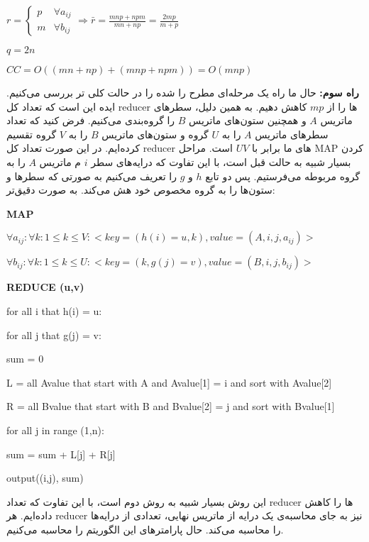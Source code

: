 \documentclass[a4paper,12pt]{article}
\begin{document}
\begin{LTR}
$r = \begin{cases}
	p & \forall a_{ij} \\
	m & \forall b_{ij}
\end{cases} \Rightarrow \bar{r} = \frac{mnp + npm}{mn + np} = \frac{2mp}{m+p}$

$q = 2n$

$CC = O((mn + np) + (mnp + npm)) = O(mnp)$

 \end{LTR}

\textbf{راه سوم: }
حال ما راه یک مرحله‌ای مطرح را شده را در حالت کلی تر بررسی می‌کنیم. ایده این است که تعداد کل 
reducer
ها را از 
$mp$
کاهش دهیم. به همین دلیل، سطر‌های ماتریس
$A$
و همچنین ستون‌های ماتریس
$B$
را گروه‌بندی می‌کنیم. فرض کنید که تعداد سطر‌های ماتریس
$A$
را به
$U$
گروه و ستون‌های ماتریس
$B$
را به 
$V$
گروه تقسیم کرده‌ایم. 
در این صورت تعداد کل 
reducer
های ما برابر با
$UV$
است. مراحل 
MAP
کردن بسیار شبیه به حالت قبل است، با این تفاوت که درایه‌های سطر
$i$
م ماتریس 
$A$
را به گروه مربوطه می‌فرستیم. پس دو تابع 
$h$
و
$g$
را تعریف می‌کنیم به صورتی که سطر‌ها و ستون‌ها را به گروه مخصوص خود هش می‌کند. به صورت دقیق‌تر:  


\begin{latin}
\textbf{MAP}

$\forall a_{ij} : \forall k:  1 \leq k \leq V : < key = (h(i) = u, k) , value = (A, i, j, a_{ij})> $

$\forall b_{ij} : \forall k:  1 \leq k \leq U : < key = (k, g(j) = v) , value = (B, i, j, b_{ij})> $


\textbf{REDUCE (u,v)}

for all i that h(i) = u:

for all j that g(j) = v:

\quad	sum = 0

\quad	L = all Avalue that start with A and Avalue[1] = i and sort with Avalue[2]

\quad	R = all	Bvalue that start with B and Bvalue[2] = j and sort with Bvalue[1]


\qquad for all j in range (1,n):

\qquad \quad sum = sum + L[j] + R[j]

\quad output((i,j), sum)



\end{latin}

این روش بسیار شبیه به روش دوم است، با این تفاوت که تعداد
reducer
ها را کاهش داده‌ایم. هر 
reducer
نیز به جای محاسبه‌ی یک درایه از ماتریس نهایی، تعدادی از درایه‌ها را محاسبه می‌کند. حال پارامتر‌های این 
الگوریتم را محاسبه می‌کنیم. 
\end{document}
